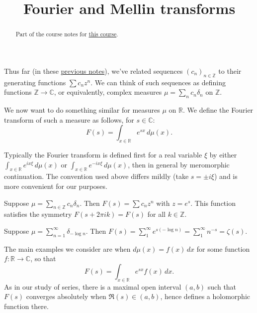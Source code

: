 \documentclass[reqno]{amsart} 
\begin{document}
\title{Fourier and Mellin transforms}

\begin{abstract}
  Part of the course notes for \href{2023-introduction-to-zeta-and-l-functions.pdf}{this course}.
\end{abstract}

Thus far (in these \href{20230907T142550--generating-functions-asymptotics.tex.pdf}{previous notes}), we've related sequences $(c_n)_{n \in \mathbb{Z}}$ to their generating functions $\sum c_n z^n$.  We can think of such sequences as defining functions $\mathbb{Z} \rightarrow \mathbb{C}$, or equivalently, complex measures $\mu = \sum_n c_n \delta_n$ on $\mathbb{Z}$.

We now want to do something similar for measures $\mu$ on $\mathbb{R}$. We define the Fourier transform of such a measure as follows, for $s \in \mathbb{C}$:
\begin{equation*}
  F(s) = \int_{x \in \mathbb{R} } e^{s x } \, d \mu (x).
\end{equation*}
\begin{remark}
  Typically the Fourier transform is defined first for a real variable $\xi$ by either $\int_{x \in \mathbb{R} } e^{i x \xi } \, d \mu(x)$ or $\int_{x \in \mathbb{R} } e^{-i x \xi } \, d \mu(x)$, then in general by meromorphic continuation.  The convention used above differs mildly (take $s = \pm i \xi$) and is more convenient for our purposes.
\end{remark}
\begin{example}
  Suppose $\mu = \sum_{n \in \mathbb{Z} } c_n \delta_n$.  Then $F (s) = \sum c_n z^n$ with $z = e^s$.  This function satisfies the symmetry $F (s + 2 \pi i k) = F (s)$ for all $k \in \mathbb{Z}$.
\end{example}
\begin{example}
  Suppose $\mu = \sum_{n =1 }^\infty \delta_{- \log n}$.  Then $F (s) = \sum_1^\infty e^{s (- \log n )} = \sum_1^\infty n^{- s} = \zeta(s)$.
\end{example}
The main examples we consider are when $d \mu (x) = f (x) \, d x$ for some function $f : \mathbb{R} \rightarrow \mathbb{C}$, so that
\begin{equation*}
  F (s) = \int_{x \in \mathbb{R} } e^{s x } f (x) \, d x.
\end{equation*}
As in our study of series, there is a maximal open interval $(a,b)$ such that $F (s)$ converges absolutely when $\Re(s) \in (a,b)$, hence defines a holomorphic function there.
\end{document}
